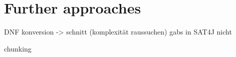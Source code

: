 \section{Further approaches}
DNF konversion -> schnitt (komplexität raussuchen)
gabs in SAT4J nicht

chunking